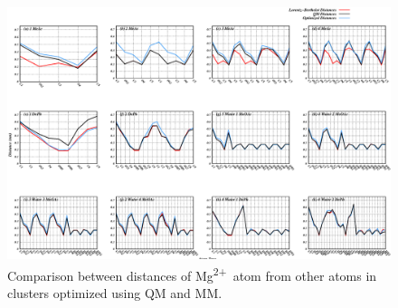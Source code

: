 \documentclass[journal=langd5,manuscript=article]{achemso}
\newcommand{\mg}{Mg\textsuperscript{2+}}
\begin{document}
\begin{landscape}
\centering
\begin{figure}
    \caption{Comparison between distances of \mg~atom from other atoms in clusters optimized using QM and MM.}
    \label{fig:optres}
    \includegraphics[height=\textheight]{figures/Figure_S1.eps}
\end{figure}
\end{landscape}
%
\end{document}
